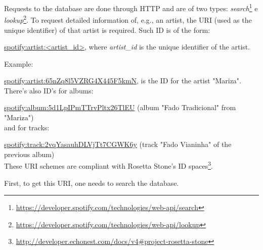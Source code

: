       Requests to the database are done through HTTP and are of two types: \emph{search}\footnote{\url{https://developer.spotify.com/technologies/web-api/search}} e \emph{lookup}\footnote{\url{https://developer.spotify.com/technologies/web-api/lookup}}.
      To request detailed information of, e.g., an artist, the URI (used as the unique identifier) of that artist is required. Such ID is of the form:

      \url{spotify:artist:<artist_id>}, where \emph{artist\_id} is the unique identifier of the artist.

      Example:

      \url{spotify:artist:65nZq8l5VZRG4X445F5kmN}, is the ID for the artist "Mariza". \\

      There's also ID's for albums:

      \url{spotify:album:5d1LpIPmTTrvPltx26TlEU} (album "Fado Tradicional" from "Mariza") \\

       and for tracks:

       \url{spotify:track:2vqYasauhDLVjTt7CGWK6y} (track "Fado Vianinha" of the previous album) \\

      These URI schemes are compliant with Rosetta Stone's ID spaces\footnote{\url{http://developer.echonest.com/docs/v4\#project-rosetta-stone}}.

      First, to get this URI, one needs to search the database.

